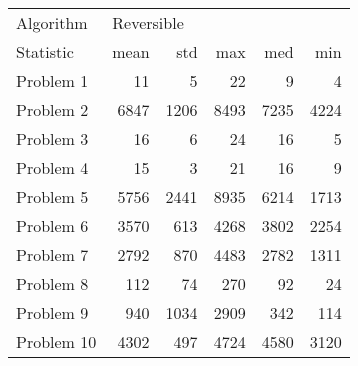 \begin{tabular}{lrrrrr}
\toprule
Algorithm & \multicolumn{5}{l}{Reversible} \\
Statistic &       mean &   std &   max &   med &   min \\
\midrule
Problem 1  &         11 &     5 &    22 &     9 &     4 \\
Problem 2  &       6847 &  1206 &  8493 &  7235 &  4224 \\
Problem 3  &         16 &     6 &    24 &    16 &     5 \\
Problem 4  &         15 &     3 &    21 &    16 &     9 \\
Problem 5  &       5756 &  2441 &  8935 &  6214 &  1713 \\
Problem 6  &       3570 &   613 &  4268 &  3802 &  2254 \\
Problem 7  &       2792 &   870 &  4483 &  2782 &  1311 \\
Problem 8  &        112 &    74 &   270 &    92 &    24 \\
Problem 9  &        940 &  1034 &  2909 &   342 &   114 \\
Problem 10 &       4302 &   497 &  4724 &  4580 &  3120 \\
\bottomrule
\end{tabular}
